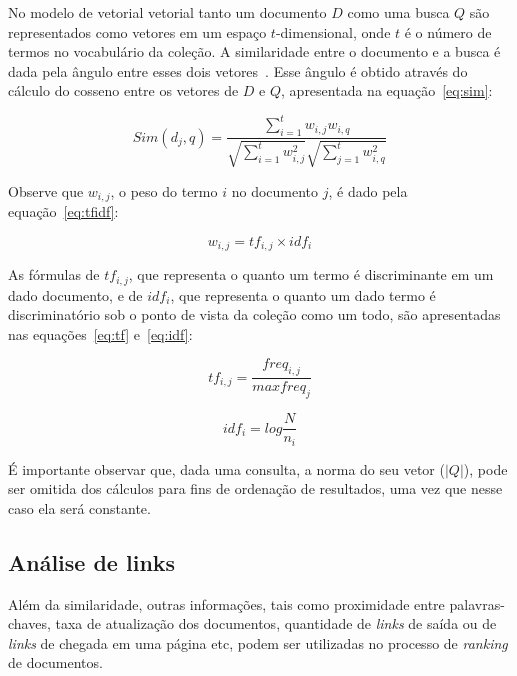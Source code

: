 \documentclass[10pt,twocolumn]{article}
\begin{document}
No modelo de vetorial vetorial tanto um documento \(D\) como uma busca
\(Q\) são representados como vetores em um espaço \(t\)-dimensional,
onde \(t\) é o número de termos no vocabulário da coleção. A
similaridade entre o documento e a busca é dada pela ângulo entre esses
dois vetores~\cite{berthier1999modern}.
Esse ângulo é obtido através do cálculo do cosseno entre
os vetores de \(D\) e \(Q\), apresentada na equação~\ref{eq:sim}:

\begin{equation}
Sim(d_{j},q) = \frac{\sum_{i = 1}^{t}w_{i,j} w_{i,q}}{\sqrt{\sum_{i =
1}^{t}w_{i,j}^{2}} \sqrt{\sum_{j = 1}^{t}w_{i,q}^{2}}}
\label{eq:sim}
\end{equation}

Observe que \(w_{i,j}\), o peso do termo \(i\) no documento \(j\), é
dado pela equação~\ref{eq:tfidf}:


\begin{equation}
w_{i,j} = tf_{i,j}\times idf_{i}
\label{eq:tfidf}
\end{equation}

As fórmulas de \(tf_{i,j}\), que representa o quanto um termo é
discriminante em um dado documento, e de \(idf_{i}\), que representa o
quanto um dado termo é discriminatório sob o ponto de vista da coleção
como um todo, são apresentadas nas equações~\ref{eq:tf} e~\ref{eq:idf}:

\begin{equation}
tf_{i,j} = \frac{freq_{i,j}}{max freq_{j}}
\label{eq:tf}
\end{equation}

\begin{equation}
idf_{i} = log\frac{N}{n_{i}}
\label{eq:idf}
\end{equation}

É importante observar que, dada uma consulta, a norma do seu vetor
(\(|Q|\)), pode ser omitida dos cálculos para fins de ordenação de
resultados, uma vez que nesse caso ela será constante.

\subsection{Análise de links}

Além da similaridade, outras informações, tais como
proximidade entre palavras-chaves, taxa de atualização dos documentos,
 quantidade de \emph{links} de saída ou de \emph{links} de chegada em uma página
etc, podem ser utilizadas no processo de \emph{ranking} de documentos.
\end{document}
